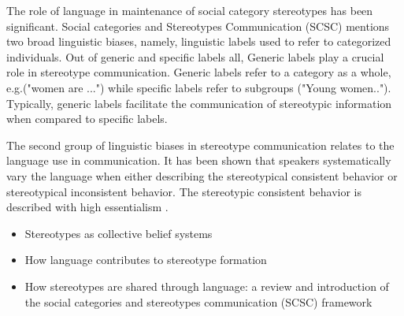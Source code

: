 The role of language in maintenance of social category stereotypes has been significant\cite{burgers2020language}.
 Social categories and Stereotypes Communication (SCSC) \cite{beukeboom2019stereotypes} mentions two broad linguistic biases, namely, linguistic labels used to refer to categorized individuals. Out of generic and specific labels all, Generic labels play a crucial role in stereotype communication\cite{burgers2020language}. Generic labels refer to a category as a whole, e.g.("women are ...") while specific labels refer to subgroups ("Young women.."). Typically, generic labels facilitate the communication of stereotypic information when compared to specific labels\cite{burgers2020language}. 
 
 The second group of linguistic biases in stereotype communication relates to the language use in communication\cite{beukeboom2019stereotypes}. It has been shown that speakers systematically vary the language when either describing the stereotypical consistent behavior or stereotypical inconsistent behavior. The stereotypic consistent behavior is described with high essentialism  \cite{burgers2020language}.  
    \begin{itemize}
        \item Stereotypes as collective belief systems \cite{macrae1996stereotypes}
        \item How language contributes to stereotype formation \cite{burgers2020language}
        \item How stereotypes are shared through language: a
    review and introduction of the social categories
    and stereotypes communication (SCSC) framework \cite{beukeboom2019stereotypes}
    \end{itemize}

